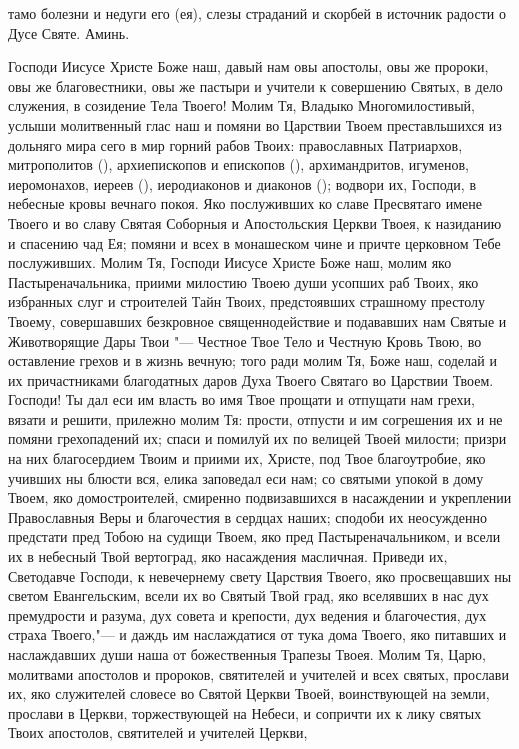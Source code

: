 \begin{mymulticols}
тамо болезни и недуги его (ея), слезы страданий и скорбей в источник радости о Дусе Святе. Аминь. 

\end{mymulticols}

\mychapterending


\vspace{-\baselineskip}
 
\begin{mymulticols}

Господи Иисусе Христе Боже наш, давый нам овы апостолы, овы же пророки, овы же благовестники, овы же пастыри и учители к совершению Святых, в дело служения, в созидение Тела Твоего! Молим Тя, Владыко Многомилостивый, услыши молитвенный глас наш и помяни во Царствии Твоем преставльшихся из дольняго мира сего в мир горний рабов Твоих: православных Патриархов, митрополитов (), архиепископов и епископов (), архимандритов, игуменов, иеромонахов, иереев (), иеродиаконов и диаконов (); водвори их, Господи, в небесные кровы вечнаго покоя. Яко послуживших ко славе Пресвятаго имене Твоего и во славу Святая Соборныя и Апостольския Церкви Твоея, к назиданию и спасению чад Ея; помяни и всех в монашеском чине и причте церковном Тебе послуживших. Молим Тя, Господи Иисусе Христе Боже наш, молим яко Пастыреначальника, приими милостию Твоею души усопших раб Твоих, яко избранных слуг и строителей Тайн Твоих, предстоявших страшному престолу Твоему, совершавших безкровное священнодействие и подававших нам Святые и Животворящие Дары Твои "--- Честное Твое Тело и Честную Кровь Твою, во оставление грехов и в жизнь вечную; того ради молим Тя, Боже наш, соделай и их причастниками благодатных даров Духа Твоего Святаго во Царствии Твоем. Господи! Ты дал еси им власть во имя Твое прощати и отпущати нам грехи, вязати и решити, прилежно молим Тя: прости, отпусти и им согрешения их и не помяни грехопадений их; спаси и помилуй их по велицей Твоей милости; призри на них благосердием Твоим и приими их, Христе, под Твое благоутробие, яко учивших ны блюсти вся, елика заповедал еси нам; со святыми упокой в дому Твоем, яко домостроителей, смиренно подвизавшихся в насаждении и укреплении Православныя Веры и благочестия в сердцах наших; сподоби их неосужденно предстати пред Тобою на судищи Твоем, яко пред Пастыреначальником, и всели их в небесный Твой вертоград, яко насаждения масличная. Приведи их, Светодавче Господи, к невечернему свету Царствия Твоего, яко просвещавших ны светом Евангельским, всели их во Святый Твой град, яко вселявших в нас дух премудрости и разума, дух совета и крепости, дух ведения и благочестия, дух страха Твоего,"--- и даждь им наслаждатися от тука дома Твоего, яко питавших и наслаждавших души наша от божественныя Трапезы Твоея. Молим Тя, Царю, молитвами апостолов и пророков, святителей и учителей и всех святых, прослави их, яко служителей словесе во Святой Церкви Твоей, воинствующей на земли, прослави в Церкви, торжествующей на Небеси, и сопричти их к лику святых Твоих апостолов, святителей и учителей Церкви, 
\end{mymulticols}
